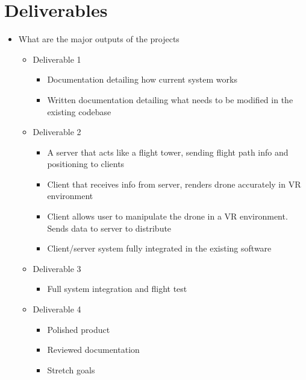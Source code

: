 \documentclass[paper=a4, fontsize=10pt]{scrartcl} %
\begin{document}
\section{Deliverables}
\begin{itemize}
	\setlength\itemsep{.25em}
	\item{What are the major outputs of the projects}
		\begin{itemize}
			\setlength\itemsep{.25em}
			\item{Deliverable 1}
			\begin{itemize}
				\setlength\itemsep{.25em}
				\item{Documentation detailing how current system works}
				\item{Written documentation detailing what needs to be modified in the existing codebase}
			\end{itemize}
		\end{itemize}
		\begin{itemize}
			\setlength\itemsep{.25em}
			\item{Deliverable 2}
			\begin{itemize}
			\setlength\itemsep{.25em}
				\item{A server that acts like a flight tower, sending flight path info and positioning to clients}
				\item{Client that receives info from server, renders drone accurately in VR environment}
				\item{Client allows user to manipulate the drone in a VR environment. Sends data to server to distribute}
				\item{Client/server system fully integrated in the existing software}
			\end{itemize}
		\end{itemize}
		\begin{itemize}
			\setlength\itemsep{.25em}
			\item{Deliverable 3}
			\begin{itemize}
				\setlength\itemsep{.25em}
				\item{Full system integration and flight test}
			\end{itemize}
		\end{itemize}
		\begin{itemize}
			\setlength\itemsep{.25em}
			\item{Deliverable 4}
				\begin{itemize}
					\item{Polished product}
					\item{Reviewed documentation}
					\item{Stretch goals}
				\end{itemize}
			\end{itemize}
\end{itemize}
\end{document}
